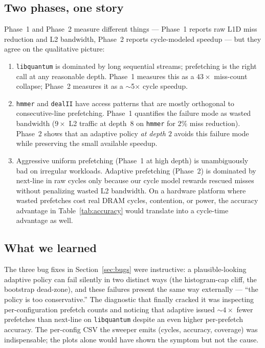 \documentclass[11pt,letterpaper]{article}
\begin{document}
\subsection{Two phases, one story}
Phase~1 and Phase~2 measure different things --- Phase~1 reports raw
L1D miss reduction and L2 bandwidth, Phase~2 reports cycle-modeled
speedup --- but they agree on the qualitative picture:

\begin{enumerate}
  \item \texttt{libquantum} is dominated by long sequential streams;
        prefetching is the right call at any reasonable depth.
        Phase~1 measures this as a $43\times$ miss-count collapse;
        Phase~2 measures it as a $\sim$5$\times$ cycle speedup.
  \item \texttt{hmmer} and \texttt{dealII} have access patterns that
        are mostly orthogonal to consecutive-line prefetching.
        Phase~1 quantifies the failure mode as wasted bandwidth
        ($9\times$ L2 traffic at depth~$8$ on \texttt{hmmer} for
        $2\%$ miss reduction). Phase~2 shows that an adaptive policy
        \emph{at depth $2$} avoids this failure mode while preserving
        the small available speedup.
  \item Aggressive uniform prefetching (Phase~1 at high depth) is
        unambiguously bad on irregular workloads. Adaptive prefetching
        (Phase~2) is dominated by next-line in raw cycles only because
        our cycle model rewards rescued misses without penalizing wasted
        L2 bandwidth. On a hardware platform where wasted prefetches
        cost real DRAM cycles, contention, or power, the accuracy
        advantage in Table~\ref{tab:accuracy} would translate into a
        cycle-time advantage as well.
\end{enumerate}

\subsection{What we learned}
The three bug fixes in Section~\ref{sec:bugs} were instructive: a
plausible-looking adaptive policy can fail silently in two distinct
ways (the histogram-cap cliff, the bootstrap dead-zone), and these
failures present the same way externally --- ``the policy is too
conservative.'' The diagnostic that finally cracked it was inspecting
per-configuration prefetch counts and noticing that adaptive issued
$\sim 4\times$ fewer prefetches than next-line on \texttt{libquantum}
despite an even higher per-prefetch accuracy. The per-config CSV the
sweeper emits (cycles, accuracy, coverage) was indispensable; the
plots alone would have shown the symptom but not the cause.
\end{document}
